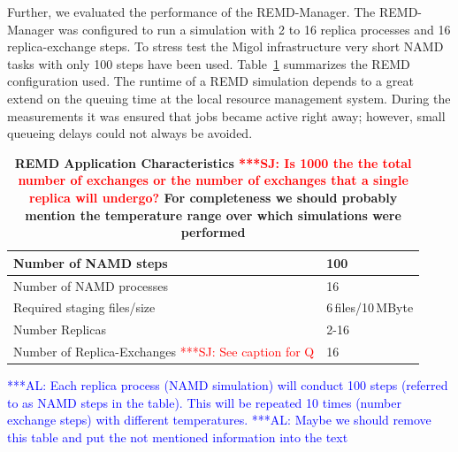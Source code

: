 \documentclass[conference,final]{IEEEtran}
\newcommand{\up}{\vspace*{-1em}}
\newcommand{\alnote}[1]{ {\textcolor{blue} { ***AL: #1 }}}
\newcommand{\jhanote}[1]{ {\textcolor{red} { ***SJ: #1 }}}
\newcommand{\alnote}[1]{}
\newcommand{\jhanote}[1]{}
\begin{document}
Further, we evaluated the performance of the REMD-Manager.  
The REMD-Manager was configured to run a simulation with 
2 to 16 replica processes and 16 replica-exchange
steps. To stress test the Migol infrastructure very short NAMD tasks
with only 100 steps have been used. Table~\ref{tab:app_stats}
summarizes the REMD configuration used. The runtime of a REMD simulation depends 
to a great extend on the queuing time at the local resource 
management system. During the measurements it was ensured that jobs became 
active right away; however, small queueing delays could not always be avoided.

\begin{table}        
    \centering
	\begin{tabular}{|p{5cm}|l|}
          \hline
          Number of NAMD steps &100\\ \hline 
          Number of NAMD processes &16\\ \hline 
          Required staging files/size &6\,files/10\,MByte\\ \hline
          Number Replicas &2-16 \\ \hline
          Number of Replica-Exchanges \jhanote{See caption for Q} &16\\ \hline
	\end{tabular}
	\caption{\footnotesize \bf REMD Application Characteristics\label{tab:app_stats}
          \jhanote{Is 1000 the the total number of exchanges or the
            number of exchanges that a single replica will undergo?}
          For completeness we should probably mention the temperature
          range over which simulations were performed}
          \alnote{Each replica process (NAMD simulation) will conduct 
          100 steps (referred to as NAMD steps in the table). This 
          will be repeated 10 times (number exchange steps) with 
          different temperatures.}         
          \alnote{Maybe we should remove this table and put the not mentioned information 
          into the text}
          \up\up
\end{table}   
\end{document}
